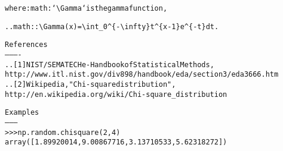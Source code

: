 \begin{boxedminipage}{\funcwidth}
\begin{alltt}
where :math:`{\textbackslash}Gamma` is the gamma function,

.. math:: {\textbackslash}Gamma(x) = {\textbackslash}int\_0{\textasciicircum}\{-{\textbackslash}infty\} t{\textasciicircum}\{x - 1\} e{\textasciicircum}\{-t\} dt.

References
----------
.. [1] NIST/SEMATECH e-Handbook of Statistical Methods,
       http://www.itl.nist.gov/div898/handbook/eda/section3/eda3666.htm
.. [2] Wikipedia, "Chi-square distribution",
       http://en.wikipedia.org/wiki/Chi-square\_distribution

Examples
--------
{\textgreater}{\textgreater}{\textgreater} np.random.chisquare(2,4)
array([ 1.89920014,  9.00867716,  3.13710533,  5.62318272])
\end{alltt}

\setlength{\parskip}{1ex}
    \end{boxedminipage}

    \label{trunk:qstkutil:bollinger:exponential}

    \vspace{0.5ex}

